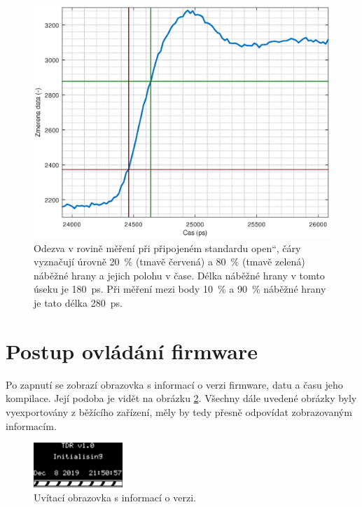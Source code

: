 \begin{figure}[H]
\includegraphics[width=\textwidth,keepaspectratio]{images/rising_edge_DUT_open.eps}\caption{Odezva v rovině měření při připojeném standardu \quotedblbase open\textquotedblleft , čáry vyznačují úrovně \SI{20}{\percent} (tmavě červená) a \SI{80}{\percent} (tmavě zelená) náběžné hrany a jejich polohu v čase. Délka náběžné hrany v tomto úseku je \SI{180}{\pico\second}. Při měření mezi body \SI{10}{\percent} a \SI{90}{\percent} náběžné hrany je tato délka \SI{280}{\pico\second}.}\label{rising_edge_DUT_open}
\end{figure}

\section{Postup ovládání firmware}
Po zapnutí se zobrazí obrazovka s informací o verzi firmware, datu a času jeho kompilace. Její podoba je vidět na obrázku \ref{greeting_screen}. Všechny dále uvedené obrázky byly vyexportovány z běžícího zařízení, měly by tedy přesně odpovídat zobrazovaným informacím.

\begin{figure}[H]
\includegraphics[width=0.3\textwidth,keepaspectratio]{images/greeting_screen.png}\caption{Uvítací obrazovka s informací o verzi.}\label{greeting_screen}
\end{figure}

